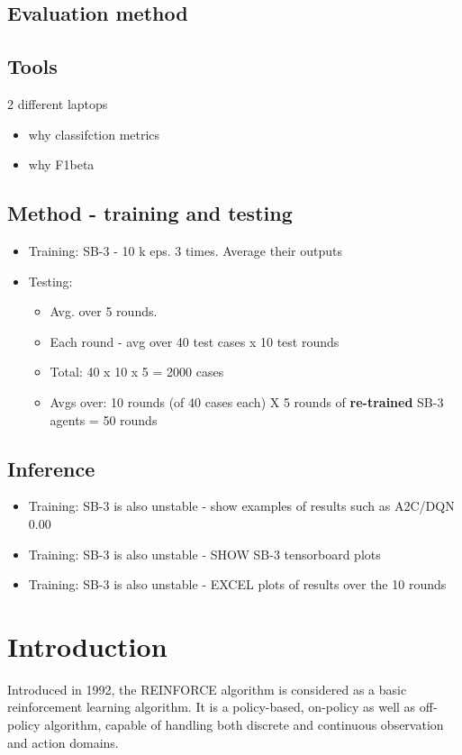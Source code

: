 \documentclass[a4paper, 12pt]{article}
\begin{document}
\subsection{Evaluation method}
\subsection{Tools}
2 different laptops

\begin{itemize}
	\item why classifction metrics
	\item why F1beta	
\end{itemize}

\subsection{Method - training and testing}

\begin{itemize}
	\item Training: SB-3 - 10 k eps. 3 times. Average their outputs
	\item Testing: 
	\begin{itemize}
		\item Avg. over 5 rounds.
		\item Each round - avg over 40 test cases x 10 test rounds
		\item Total: 40 x 10 x 5 = 2000 cases
		\item Avgs over: 10 rounds (of 40 cases each) X 5 rounds of \textbf{re-trained} SB-3 agents = 50 rounds 
	\end{itemize}
\end{itemize}

\subsection{Inference}
\begin{itemize}
	\item Training: SB-3 is also unstable - show examples of results such as A2C/DQN 0.00 
	\item Training: SB-3 is also unstable - SHOW SB-3 tensorboard plots
	\item Training: SB-3 is also unstable - EXCEL plots of results over the 10 rounds 	
\end{itemize}


\section{Introduction}
Introduced in 1992, the REINFORCE algorithm is considered as a basic reinforcement learning algorithm. It is a policy-based, on-policy as well as off-policy algorithm, capable of handling both discrete and continuous observation and action domains.
\end{document}
